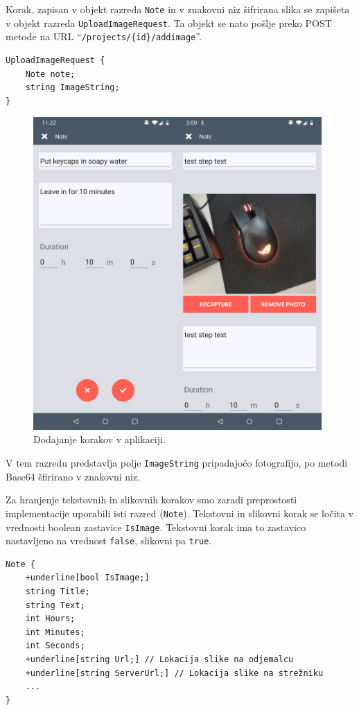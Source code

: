 \documentclass[a4paper, 12pt]{book}
\begin{document}
Korak, zapisan v objekt razreda \texttt{Note} in v znakovni niz šifrirana slika se zapišeta v objekt razreda \texttt{UploadImageRequest}.
Ta objekt se nato pošlje preko POST metode na URL \enquote{\texttt{/projects/\{id\}/addimage}}.

\begin{verbatim}
UploadImageRequest { 
    Note note; 
    string ImageString; 
}
\end{verbatim}

\begin{figure}[H]
\begin{center}
\includegraphics[width=11cm]{app_note_image}
\end{center}
	\caption{Dodajanje korakov v aplikaciji.}
\label{note_image}
\end{figure}

V tem razredu predstavlja polje \texttt{ImageString} pripadajočo fotografijo, po metodi Base64 šfirirano v znakovni niz.

Za hranjenje tekstovnih in slikovnih korakov smo zaradi preprostosti implementacije uporabili isti razred (\texttt{Note}).
Tekstovni in slikovni korak se ločita v vrednosti boolean zastavice \texttt{IsImage}.
Tekstovni korak ima to zastavico nastavljeno na vrednost \texttt{false}, slikovni pa \texttt{true}.

\begin{Verbatim}[commandchars=+\[\]]
Note { 
    +underline[bool IsImage;]
    string Title; 
    string Text; 
    int Hours; 
    int Minutes;
    int Seconds; 
    +underline[string Url;] // Lokacija slike na odjemalcu 
    +underline[string ServerUrl;] // Lokacija slike na strežniku
    ... 
}
\end{Verbatim}
\end{document}
